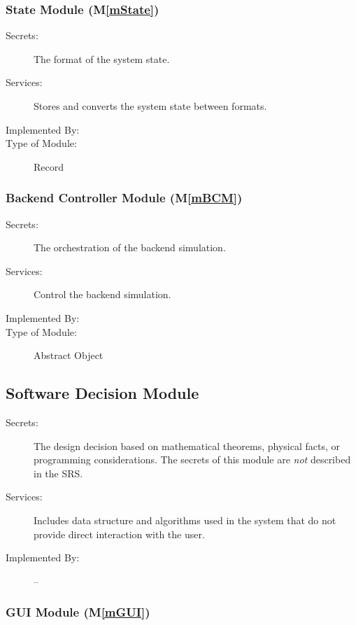 \documentclass[12pt, titlepage]{article}
\newcommand{\mref}[1]{M\ref{#1}}
\begin{document}
\subsubsection{State Module (\mref{mState})}

\begin{description}
\item[Secrets:] The format of the system state.
\item[Services:] Stores and converts the system state between formats.
\item[Implemented By:] \progname{}
\item[Type of Module:] Record
\end{description}

\subsubsection{Backend Controller Module (\mref{mBCM})}

\begin{description}
\item[Secrets:] The orchestration of the backend simulation.
\item[Services:] Control the backend simulation.
\item[Implemented By:] \progname{}
\item[Type of Module:] Abstract Object
\end{description}



\subsection{Software Decision Module}

\begin{description}
\item[Secrets:] The design decision based on mathematical theorems, physical
  facts, or programming considerations. The secrets of this module are
  \emph{not} described in the SRS.
\item[Services:] Includes data structure and algorithms used in the system that
  do not provide direct interaction with the user. 
\item[Implemented By:] --
\end{description}

\subsubsection{GUI Module (\mref{mGUI})}
\end{document}
